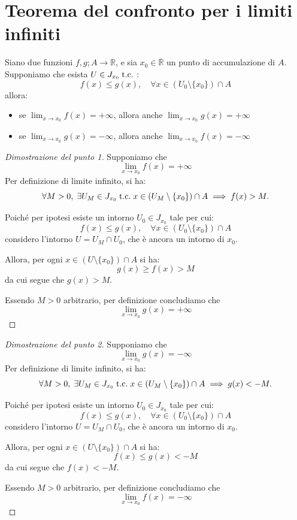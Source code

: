 \documentclass[a4paper,12pt,openright]{book}
\begin{document}
	\newpage
	
	\section{Teorema del confronto per i limiti infiniti}
	Siano due funzioni $f, g; A \longrightarrow \mathbb{R}$, e sia $x_0 \in \overline{\mathbb{R}}$ un punto di accumulazione di $A$. Supponiamo che esista $U \in J_{x_0} \;\text{t.c.}\;$:
	\[f(x) \leq g(x), \quad \forall x \in (U_0 \setminus \{x_0\}) \cap A\]allora:
	\begin{itemize}
		\item se $\lim_{x \rightarrow x_0} f(x) = + \infty$, allora anche $\lim_{x \rightarrow x_0} g(x) = + \infty$
		\item se $\lim_{x \rightarrow x_0} g(x) = - \infty$, allora anche $\lim_{x \rightarrow x_0} f(x) = - \infty$
	\end{itemize}
	
	\begin{proof}[Dimostrazione del punto 1]
		Supponiamo che
		\[\lim_{x \to x_0} f(x) = +\infty\]
		Per definizione di limite infinito, si ha:
		\[\forall M > 0, \; \exists U_M \in J_{x_0} \;\text{t.c.}\; x \in (U_M \setminus \{x_0\}) \cap A \implies f(x) > M.\]
		
		Poiché per ipotesi esiste un intorno $U_0 \in J_{x_0}$ tale per cui:
		\[f(x) \le g(x), \quad \forall x \in (U_0 \setminus \{x_0\}) \cap A\]
		considero l’intorno $U = U_M \cap U_0$, che è ancora un intorno di $x_0$.
		
		Allora, per ogni $x \in (U \setminus \{x_0\}) \cap A$ si ha:
		\[g(x) \geq f(x) > M\]
		da cui segue che $g(x) > M$.
		
		Essendo $M > 0$ arbitrario, per definizione concludiamo che
		\[\lim_{x \to x_0} g(x) = +\infty\]
	\end{proof}
	
	
	\begin{proof}[Dimostrazione del punto 2]
		Supponiamo che
		\[\lim_{x \to x_0} g(x) = -\infty\]
		Per definizione di limite infinito, si ha:
		\[\forall M > 0, \; \exists U_M \in J_{x_0} \;\text{t.c.}\;	x \in (U_M \setminus \{x_0\}) \cap A \implies g(x) < -M.\]
		
		Poiché per ipotesi esiste un intorno $U_0 \in J_{x_0}$ tale per cui:
		\[f(x) \le g(x), \quad \forall x \in (U_0 \setminus \{x_0\}) \cap A\]
		considero l’intorno $U = U_M \cap U_0$, che è ancora un intorno di $x_0$.
		
		Allora, per ogni $x \in (U \setminus \{x_0\}) \cap A$ si ha:
		\[f(x) \leq g(x) < - M\]
		da cui segue che $f(x) < -M$.
		
		Essendo $M > 0$ arbitrario, per definizione concludiamo che
		\[\lim_{x \to x_0} f(x) = -\infty\]
	\end{proof}
	
\end{document}
